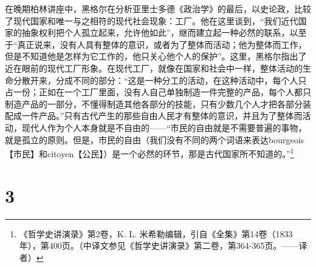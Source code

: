 在晚期柏林讲座中，黑格尔在分析亚里士多德《政治学》的最后，以史论政，比较了现代国家和唯一与之相符的现代社会现象：工厂。他在这里谈到，“我们近代国家的抽象权利把个人孤立起来，允许他如此”，继而建立起一种必然的联系，以至于“真正说来，没有人具有整体的意识，或者为了整体而活动；他为整体而工作，但是不知道他是怎样为它工作的，他只关心他个人的保护”。这里，黑格尔指出了近在眼前的现代工厂形象。在现代工厂，就像在国家和社会中一样，整体活动的生命分散开来，分成不同的部分：“这是一种分工的活动，在这种活动中，每个人只占一份；正如在一个工厂里面，没有人自己单独制造一件完整的产品，每个人都只制造产品的一部分，不懂得制造其他各部分的技能，只有少数几个人才把各部分装配成一件产品。”只有古代产生的那些自由人民才有整体的意识，并且为了整体而活动，现代人作为个人本身就是不自由的——“市民的自由就是不需要普遍的事物，就是孤立的原则。但是，市民的自由（我们没有不同的两个词语来表达bourgeois【市民】和citoyen【公民】）是一个必然的环节，那是古代国家所不知道的。”\footnote{《哲学史讲演录》第2卷，K. L. 米希勒编辑，引自《全集》第14卷（1833年），第400页。（中译文参见《哲学史讲演录》第二卷，第364-365页。——译者）}

\section*{3}

